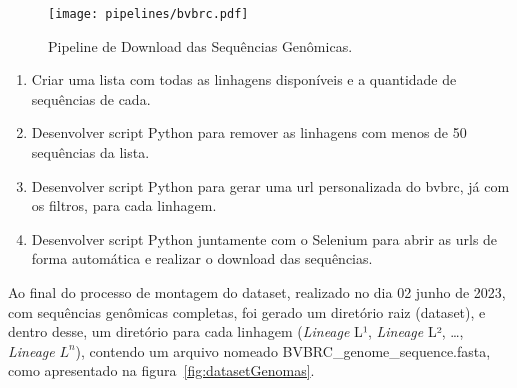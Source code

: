 \begin{figure}[htb]
  \centering
  \caption{Pipeline de Download das Sequências Genômicas.}
  \texttt{[image: pipelines/bvbrc.pdf]}
  ~\label{fig:pipelineBvbrc}
\end{figure}

\begin{enumerate}
  \item Criar uma lista com todas as linhagens disponíveis e a quantidade de sequências de cada.
  \item Desenvolver script Python para remover as linhagens com menos de 50 sequências da lista.
  \item Desenvolver script Python para gerar uma url personalizada do \gls{bvbrc}, já com os filtros, para cada linhagem.
  \item Desenvolver script Python juntamente com o Selenium para abrir as urls de forma automática e realizar o download das sequências.
\end{enumerate}

Ao final do processo de montagem do dataset, realizado no dia 02 junho de 2023, com sequências genômicas completas, foi gerado um diretório raiz (dataset), e dentro desse, um diretório para cada linhagem (\textit{Lineage} L¹, \textit{Lineage} L², \dots, \textit{Lineage} $L^{n}$), contendo um arquivo nomeado \textnormal{BVBRC\_genome\_sequence.fasta}, como apresentado na figura~\ref{fig:datasetGenomas}.

